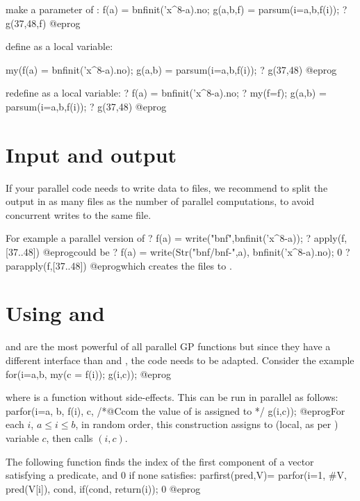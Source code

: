 \item make  a parameter of :
\bprog
f(a) = bnfinit('x^8-a).no;
g(a,b,f) = parsum(i=a,b,f(i));
? g(37,48,f)
@eprog

\item define  as a local variable:

\bprog
{
  my(f(a) = bnfinit('x^8-a).no);
  g(a,b) = parsum(i=a,b,f(i));
}
? g(37,48)
@eprog

\item redefine  as a local variable:
\bprog
? f(a) = bnfinit('x^8-a).no;
? my(f=f); g(a,b) = parsum(i=a,b,f(i));
? g(37,48)
@eprog

\section{Input and output}
If your parallel code needs to write data to files, we recommend to split
the output in as many files as the number of parallel computations, to avoid
concurrent writes to the same file.

For example a parallel version of
\bprog
? f(a) = write("bnf",bnfinit('x^8-a));
? apply(f,[37..48])
@eprog\noindent could be
\bprog
? f(a) = write(Str("bnf/bnf-",a), bnfinit('x^8-a).no); 0
? parapply(f,[37..48])
@eprog\noindent which creates the files  to .

\section{Using  and }
 and  are the most powerful of all parallel GP
functions but since they have a different interface than  and
, the code needs to be adapted. Consider the example
\bprog
for(i=a,b,
  my(c = f(i));
  g(i,c));
@eprog\noindent

where  is a function without side-effects.  This can be run in parallel
as follows:
\bprog
parfor(i=a, b,
  f(i),
  c,     /*@Ccom the value of  is assigned to  */
  g(i,c));
@eprog\noindent For each $i$, $a \leq i \leq b$, in random order,
this construction assigns  to (local, as per ) variable
$c$, then calls $(i,c)$.

The following function finds the index of the first component of a vector
satisfying a predicate, and $0$ if none satisfies:
\bprog
parfirst(pred,V)=
{
  parfor(i=1, #V,
    pred(V[i]),
    cond,
    if(cond, return(i));
  0
}
@eprog

